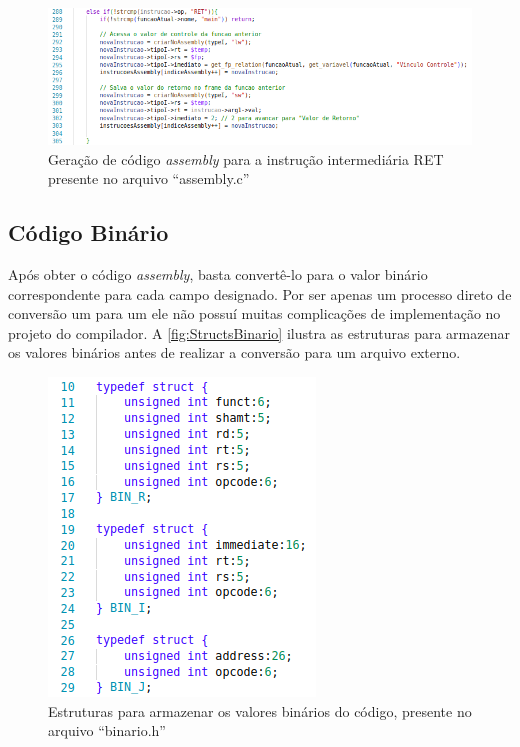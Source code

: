 \documentclass[
	12pt,				%
	oneside,
	a4paper,			%
	english,			%
	french,				%
	spanish,			%
	brazil,				%
	]{abntex2}
\begin{document}
\begin{figure}[H]
\centering 
\caption{Geração de código \emph{assembly} para a instrução intermediária RET presente no arquivo ``assembly.c''} \label{fig:AssemblyRET}
\graphicspath{ {./imgs/} } 
\includegraphics[scale=0.4]{imgs/Codigo/Cod_Assembly_Ret.png}
\end{figure}

\subsection{Código Binário}

Após obter o código \emph{assembly}, basta convertê-lo para o valor binário correspondente para cada campo designado. Por ser apenas um processo direto de conversão um para um ele não possuí muitas complicações de implementação no projeto do compilador. A \autoref{fig:StructsBinario} ilustra as estruturas para armazenar os valores binários antes de realizar a conversão para um arquivo externo.

\begin{figure}[htbp]
\centering 
\caption{Estruturas para armazenar os valores binários do código, presente no arquivo \nohyphens{``binario.h''}} 
\label{fig:StructsBinario}
\graphicspath{ {./imgs/} } 
\includegraphics[scale=0.6]{imgs/Codigo/Struct_CodigoBinario.png}
\end{figure}
\end{document}
